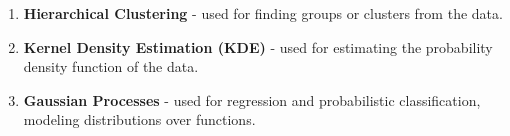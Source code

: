 \begin{enumerate}
    \item \textbf{Hierarchical Clustering} - used for finding groups or clusters from the data.
    \item \textbf{Kernel Density Estimation (KDE)} - used for estimating the probability density function of the data.
    \item \textbf{Gaussian Processes} - used for regression and probabilistic classification, modeling distributions over functions.
\end{enumerate}
